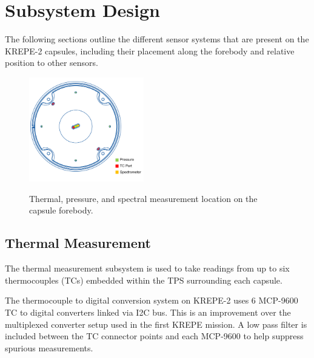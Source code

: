 \documentclass{article}
\begin{document}
\section{Subsystem Design}
\label{sec:subsystems}

The following sections outline the different sensor systems that are present on the KREPE-2 capsules, including their placement along the forebody and relative position to other sensors. 

\begin{figure}
\centering
\includegraphics[width=5cm]{images/tps_cad_highlight}
\label{fig:sensor-locations}
\caption{Thermal, pressure, and spectral measurement location on the capsule forebody.}
\end{figure}

\subsection{Thermal Measurement}
The thermal measurement subsystem is used to take readings from up to six thermocouples (TCs) embedded within the TPS surrounding each capsule. 

The thermocouple to digital conversion system on KREPE-2 uses 6 MCP-9600 TC to digital converters linked via I2C bus. This is an improvement over the multiplexed converter setup used in the first KREPE mission. A low pass filter is included between the TC connector points and each MCP-9600 to help suppress spurious measurements.


\end{document}
